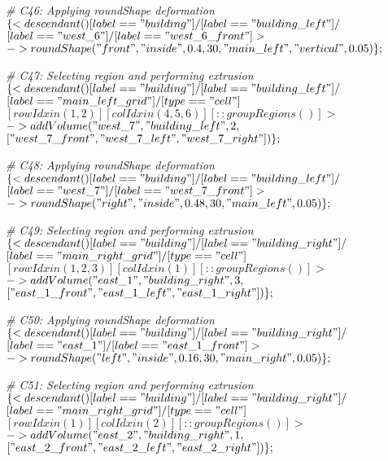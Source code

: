 \noindent \textit{\# C46: Applying roundShape deformation}\\
$\{< descendant() [label=="building"] / [label=="building\_left"] / $\\
$[label=="west\_6"] / [label=="west\_6\_front"] > $\\
$-> roundShape("front", "inside", 0.4, 30, "main\_left", "vertical", 0.05)\};$

\noindent \textit{\# C47: Selecting region and performing extrusion}\\
$\{< descendant() [label=="building"] / [label=="building\_left"] / $\\
$[label=="main\_left\_grid"] / [type=="cell"] $\\
$[rowIdx in (1, 2)] [colIdx in (4, 5, 6)] [::groupRegions()] > $\\
$-> addVolume("west\_7", "building\_left", 2, $\\
$["west\_7\_front", "west\_7\_left", "west\_7\_right"])\};$

\noindent \textit{\# C48: Applying roundShape deformation}\\
$\{< descendant() [label=="building"] / [label=="building\_left"] / $\\
$[label=="west\_7"] / [label=="west\_7\_front"] > $\\
$-> roundShape("right", "inside", 0.48, 30, "main\_left", 0.05)\};$

\noindent \textit{\# C49: Selecting region and performing extrusion}\\
$\{< descendant() [label=="building"] / [label=="building\_right"] / $\\
$[label=="main\_right\_grid"] / [type=="cell"] $\\
$[rowIdx in (1, 2, 3)] [colIdx in (1)] [::groupRegions()] > $\\
$-> addVolume("east\_1", "building\_right", 3, $\\
$["east\_1\_front", "east\_1\_left", "east\_1\_right"])\};$

\noindent \textit{\# C50: Applying roundShape deformation}\\
$\{< descendant() [label=="building"] / [label=="building\_right"] / $\\
$[label=="east\_1"] / [label=="east\_1\_front"] > $\\
$-> roundShape("left", "inside", 0.16, 30, "main\_right", 0.05)\};$

\noindent \textit{\# C51: Selecting region and performing extrusion}\\
$\{< descendant() [label=="building"] / [label=="building\_right"] / $\\
$[label=="main\_right\_grid"] / [type=="cell"] $\\
$[rowIdx in (1)] [colIdx in (2)] [::groupRegions()] > $\\
$-> addVolume("east\_2", "building\_right", 1, $\\
$["east\_2\_front", "east\_2\_left", "east\_2\_right"])\};$

